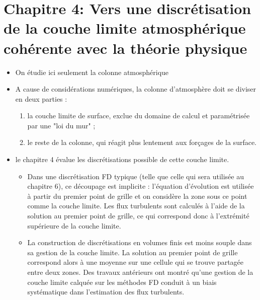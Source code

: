 \section*{Chapitre 4: Vers une discrétisation de la couche limite atmosphérique cohérente avec la théorie physique}
\begin{itemize}
	\item On étudie ici seulement la colonne atmosphérique
	\item A cause de considérations numériques, la colonne
		d'atmosphère doit se diviser en deux parties :
	\begin{enumerate}
		\item
		la couche limite de surface, exclue du domaine
		de calcul et paramétrisée par une "loi du mur" ;
		\item
		le reste de la colonne, qui réagit plus lentement
		aux forçages de la surface.
	\end{enumerate}
	\item le chapitre 4 évalue les discrétisations possible
		de cette couche limite.
		\begin{itemize}
		\item
	Dans une discrétisation FD typique (telle que celle qui sera
	utilisée au chapitre 6), ce découpage est implicite :
	l'équation d'évolution est utilisée à partir
	du premier point de grille et on considère la zone
	sous ce point comme la couche limite.
	Les flux turbulents sont calculés à l'aide de la solution
		au premier point de grille, ce qui correspond donc à
		l'extrémité supérieure de la couche limite.
	\item La construction de discrétisations en volumes finis
		est moins souple dans sa gestion de la couche limite.
		La solution au premier point de grille correspond
		alors à une moyenne sur une cellule qui se trouve
		partagée entre deux zones.
		Des travaux antérieurs ont montré qu'une gestion
		de la couche limite calquée sur les méthodes FD
		conduit à un biais systématique dans l'estimation
		des flux turbulents.
\end{itemize}


\end{itemize}
